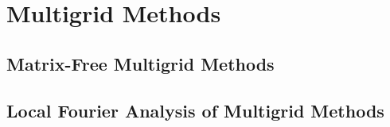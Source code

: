 \chapter{Multigrid Methods}\label{ch:MultigridMethods}


\section{Matrix-Free Multigrid Methods}\label{sec:matrixfreemultigrid}


\section{Local Fourier Analysis of Multigrid Methods}\label{sec:lfaofmultigrid}
